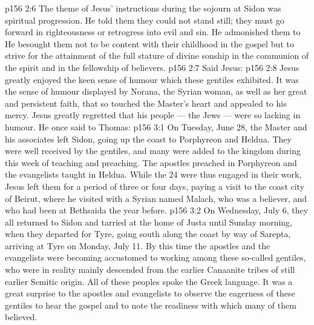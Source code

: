 \vs p156 2:6 \pc The theme of Jesus’ instructions during the sojourn at Sidon was spiritual progression. He told them they could not stand still; they must go forward in righteousness or retrogress into evil and sin. He admonished them to  He besought them not to be content with their childhood in the gospel but to strive for the attainment of the full stature of divine sonship in the communion of the spirit and in the fellowship of believers.
\vs p156 2:7 Said Jesus: 
\vs p156 2:8 Jesus greatly enjoyed the keen sense of humour which these gentiles exhibited. It was the sense of humour displayed by Norana, the Syrian woman, as well as her great and persistent faith, that so touched the Master’s heart and appealed to his mercy. Jesus greatly regretted that his people --- the Jews --- were so lacking in humour. He once said to Thomas: 
\vs p156 3:1 On Tuesday, June 28, the Master and his associates left Sidon, going up the coast to Porphyreon and Heldua. They were well received by the gentiles, and many were added to the kingdom during this week of teaching and preaching. The apostles preached in Porphyreon and the evangelists taught in Heldua. While the 24 were thus engaged in their work, Jesus left them for a period of three or four days, paying a visit to the coast city of Beirut, where he visited with a Syrian named Malach, who was a believer, and who had been at Bethsaida the year before.
\vs p156 3:2 On Wednesday, July 6, they all returned to Sidon and tarried at the home of Justa until Sunday morning, when they departed for Tyre, going south along the coast by way of Sarepta, arriving at Tyre on Monday, July 11. By this time the apostles and the evangelists were becoming accustomed to working among these so\hyp{}called gentiles, who were in reality mainly descended from the earlier Canaanite tribes of still earlier Semitic origin. All of these peoples spoke the Greek language. It was a great surprise to the apostles and evangelists to observe the eagerness of these gentiles to hear the gospel and to note the readiness with which many of them believed.
